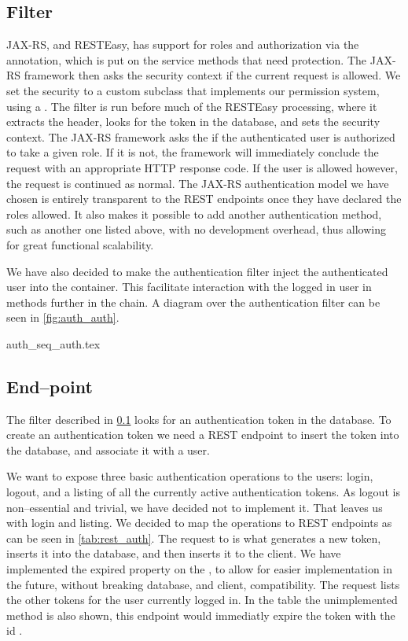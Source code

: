 \subsection{Filter}
\label{subsec:auth_filter}

JAX-RS, and RESTEasy, has support for roles and authorization via the
 annotation, which is put on the service methods that need
protection. The JAX-RS framework then asks the security context if the current
request is allowed. We set the security to a custom subclass that implements our
permission system, using a . The filter is run
before much of the RESTEasy processing, where it extracts the header, looks for
the token in the database, and sets the security context. The JAX-RS framework
asks the  if the authenticated user is authorized to take
a given role. If it is not, the framework will immediately conclude the request
with an appropriate HTTP response code. If the user is allowed however, the
request is continued as normal. The JAX-RS authentication model we have chosen
is entirely transparent to the REST endpoints once they have declared the roles
allowed. It also makes it possible to add another authentication method, such as
another one listed above, with no development overhead, thus allowing for great
functional scalability.

We have also decided to make the authentication filter inject the authenticated
user into the container. This facilitate interaction with the logged in user in
methods further in the chain. A diagram over the authentication filter can be
seen in \cref{fig:auth_auth}.

{auth_seq_auth.tex}

\subsection{End--point}
The filter described in \cref{subsec:auth_filter} looks for an authentication
token in the database. To create an authentication token we need a REST endpoint
to insert the token into the database, and associate it with a user.

We want to expose three basic authentication operations to the users: login, logout,
and a listing of all the currently active authentication tokens. As logout is
non--essential and trivial, we have decided not to implement it. That leaves us
with login and listing. We decided to map the operations to REST endpoints as
can be seen in \cref{tab:rest_auth}. The  request to  is
what generates a new token, inserts it into the database, and then inserts it to
the client. We have implemented the expired property on the , to
allow for easier implementation in the future, without breaking database, and
client, compatibility. The  request lists the other tokens for the
user currently logged in. In the table the unimplemented  method is
also shown, this endpoint would immediatly expire the token with the id
.

